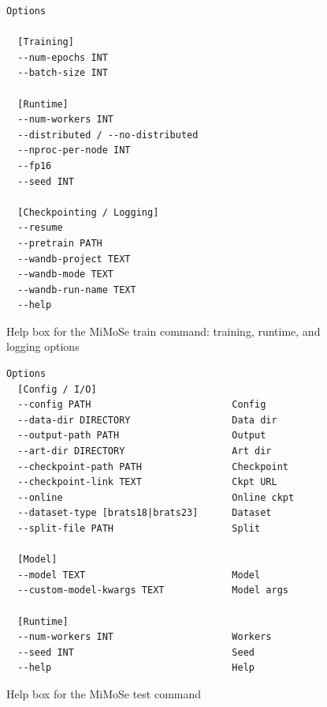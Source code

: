 \documentclass{article}
\begin{document}
\begin{figure}[h]
\centering
\begin{tcolorbox}[
  colback=lightgreenbg,
  colframe=lightgreenframe,
  arc=2mm,
  boxrule=0.6pt,
  title=MiMoSe train: execution and logging,
  fonttitle=\bfseries
]
\begin{Verbatim}[breaklines=true,breakanywhere=true,fontsize=\small]
Options

  [Training]
  --num-epochs INT
  --batch-size INT

  [Runtime]
  --num-workers INT
  --distributed / --no-distributed
  --nproc-per-node INT
  --fp16
  --seed INT

  [Checkpointing / Logging]
  --resume
  --pretrain PATH
  --wandb-project TEXT
  --wandb-mode TEXT
  --wandb-run-name TEXT
  --help
\end{Verbatim}
\end{tcolorbox}
\caption{Help box for the MiMoSe train command: training, runtime, and logging options}
\label{fig:mimose_train_runtime}
\end{figure}

\begin{figure}[h]
\centering
\begin{tcolorbox}[
  colback=lightgreenbg,
  colframe=lightgreenframe,
  arc=2mm,
  boxrule=0.6pt,
  title=MiMoSe test,
  fonttitle=\bfseries
]
\begin{Verbatim}[breaklines=true,breakanywhere=true,fontsize=\small]
Options
  [Config / I/O]
  --config PATH                         Config
  --data-dir DIRECTORY                  Data dir
  --output-path PATH                    Output
  --art-dir DIRECTORY                   Art dir
  --checkpoint-path PATH                Checkpoint
  --checkpoint-link TEXT                Ckpt URL
  --online                              Online ckpt
  --dataset-type [brats18|brats23]      Dataset
  --split-file PATH                     Split

  [Model]
  --model TEXT                          Model
  --custom-model-kwargs TEXT            Model args

  [Runtime]
  --num-workers INT                     Workers
  --seed INT                            Seed
  --help                                Help
\end{Verbatim}
\end{tcolorbox}
\caption{Help box for the MiMoSe test command}
\label{fig:mimose_test}
\end{figure}
\end{document}
